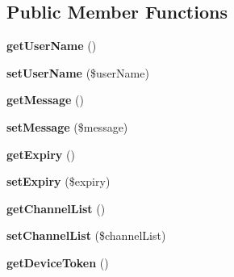 \subsection*{Public Member Functions}
\begin{DoxyCompactItemize}
\item 
\hypertarget{class_push_notification_aafd6d1ef27e6acc5833aba4012e5ee77}{{\bfseries get\+User\+Name} ()}\label{class_push_notification_aafd6d1ef27e6acc5833aba4012e5ee77}

\item 
\hypertarget{class_push_notification_a20f0087f72763b84d2992ba6ffee2fb2}{{\bfseries set\+User\+Name} (\$user\+Name)}\label{class_push_notification_a20f0087f72763b84d2992ba6ffee2fb2}

\item 
\hypertarget{class_push_notification_a0b0e611236742aac18ba1936d03ba89a}{{\bfseries get\+Message} ()}\label{class_push_notification_a0b0e611236742aac18ba1936d03ba89a}

\item 
\hypertarget{class_push_notification_a6991eb53548e7180a3a8e6f418fbb234}{{\bfseries set\+Message} (\$message)}\label{class_push_notification_a6991eb53548e7180a3a8e6f418fbb234}

\item 
\hypertarget{class_push_notification_a00e23b6060fac1e12db3b48fc06eccaa}{{\bfseries get\+Expiry} ()}\label{class_push_notification_a00e23b6060fac1e12db3b48fc06eccaa}

\item 
\hypertarget{class_push_notification_a7e41dfc0f79d70cbf08f3026623cd307}{{\bfseries set\+Expiry} (\$expiry)}\label{class_push_notification_a7e41dfc0f79d70cbf08f3026623cd307}

\item 
\hypertarget{class_push_notification_a82c3147aee6046faea83f22128c4be04}{{\bfseries get\+Channel\+List} ()}\label{class_push_notification_a82c3147aee6046faea83f22128c4be04}

\item 
\hypertarget{class_push_notification_a6f429aa86374a5b256baed57f02d1fd5}{{\bfseries set\+Channel\+List} (\$channel\+List)}\label{class_push_notification_a6f429aa86374a5b256baed57f02d1fd5}

\item 
\hypertarget{class_push_notification_adb9835c83187c0901d4188517882de38}{{\bfseries get\+Device\+Token} ()}\label{class_push_notification_adb9835c83187c0901d4188517882de38}


\end{DoxyCompactItemize}
